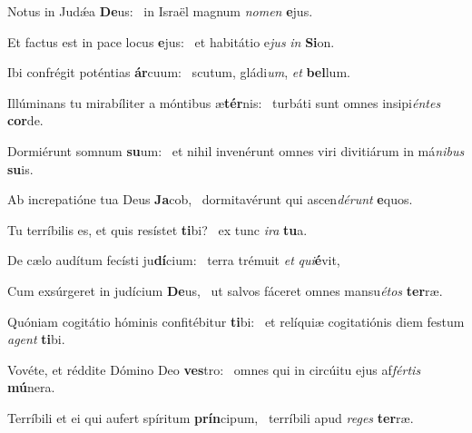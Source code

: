 \item Notus in Judǽa \textbf{De}us:~\psstar{} in Israël magnum \textit{nomen} \textbf{e}jus.
\item Et factus est in pace locus \textbf{e}jus:~\psstar{} et habitátio e\textit{jus} \textit{in} \textbf{Si}on.
\item Ibi confrégit poténtias \textbf{ár}cuum:~\psstar{} scutum, gládi\textit{um}, \textit{et} \textbf{bel}lum.
\item Illúminans tu mirabíliter a móntibus æ\textbf{tér}nis:~\psstar{} turbáti sunt omnes insipi\textit{éntes} \textbf{cor}de.
\item Dormiérunt somnum \textbf{su}um:~\psstar{} et nihil invenérunt omnes viri divitiárum in má\textit{nibus} \textbf{su}is.
\item Ab increpatióne tua Deus \textbf{Ja}cob,~\psstar{} dormitavérunt qui a\-scen\textit{dérunt} \textbf{e}quos.
\item Tu terríbilis es, et quis resístet \textbf{ti}bi?~\psstar{} ex tunc \textit{ira} \textbf{tu}a.
\item De cælo audítum fecísti ju\textbf{dí}cium:~\psstar{} terra trémuit \textit{et} \textit{qui}\textbf{é}vit,
\item Cum exsúrgeret in judícium \textbf{De}us,~\psstar{} ut salvos fáceret omnes mansu\textit{étos} \textbf{ter}ræ.
\item Quóniam cogitátio hóminis confitébitur \textbf{ti}bi:~\psstar{} et relíquiæ cogitatiónis diem festum \textit{agent} \textbf{ti}bi.
\item Vovéte, et réddite Dómino Deo \textbf{ves}tro:~\psstar{} omnes qui in circúitu ejus af\textit{fértis} \textbf{mú}nera.
\item Terríbili et ei qui aufert spíritum \textbf{prín}cipum,~\psstar{} terríbili apud \textit{reges} \textbf{ter}ræ.
